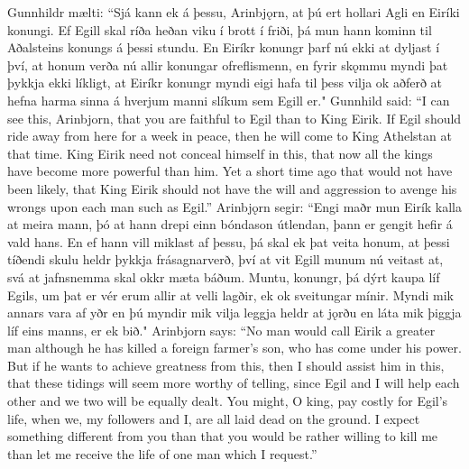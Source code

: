 \begin{paracol}{2}
    Gunnhildr mælti: ``Sjá kann ek á þessu, Arinbjǫrn, at þú ert hollari Agli en Eiríki konungi. Ef Egill skal ríða heðan viku í brott í friði, þá mun hann kominn til Aðalsteins konungs á þessi stundu. En Eiríkr konungr þarf nú ekki at dyljast í því, at honum verða nú allir konungar ofreflismenn, en fyrir skǫmmu myndi þat þykkja ekki líkligt, at Eiríkr konungr myndi eigi hafa til þess vilja ok aðferð at hefna harma sinna á hverjum manni slíkum sem Egill er."
    \switchcolumn
    Gunnhild said: ``I can see this, Arinbjorn, that you are faithful to Egil than to King Eirik. If Egil should ride away from here for a week in peace, then he will come to King Athelstan at that time. King Eirik need not conceal himself in this, that now all the kings have become more powerful than him. Yet a short time ago that would not have been likely, that King Eirik should not have the will and aggression to avenge his wrongs upon each man such as Egil.''
    \switchcolumn*
    Arinbjǫrn segir: ``Engi maðr mun Eirík kalla at meira mann, þó at hann drepi einn bóndason útlendan, þann er gengit hefir á vald hans. En ef hann vill miklast af þessu, þá skal ek þat veita honum, at þessi tíðendi skulu heldr þykkja frásagnarverð, því at vit Egill munum nú veitast at, svá at jafnsnemma skal okkr mæta báðum. Muntu, konungr, þá dýrt kaupa líf Egils, um þat er vér erum allir at velli lagðir, ek ok sveitungar mínir. Myndi mik annars vara af yðr en þú myndir mik vilja leggja heldr at jǫrðu en láta mik þiggja líf eins manns, er ek bið."
    \switchcolumn
    Arinbjorn says: ``No man would call Eirik a greater man although he has killed a foreign farmer's son, who has come under his power. But if he wants to achieve greatness from this, then I should assist him in this, that these tidings will seem more worthy of telling, since Egil and I will help each other and we two will be equally dealt. You might, O king, pay costly for Egil's life, when we, my followers and I, are all laid dead on the ground. I expect something different from you than that you would be rather willing to kill me than let me receive the life of one man which I request.''
\end{paracol}

